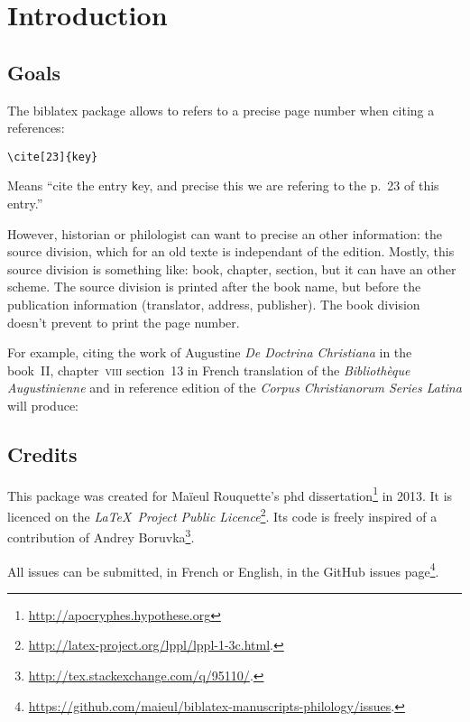 \documentclass{ltxdockit}[2011/03/25]
\newcommand{\biblatex}{biblatex\xspace}
\newcommand{\bibkey}[1]{\texttt #1}
\begin{document}
\printtitlepage

\tableofcontents
\section{Introduction}
\subsection{Goals}
The \biblatex package allows to refers to a precise page number when citing a references:
\begin{verbatim}
\cite[23]{key}
\end{verbatim}

Means \enquote{cite the entry {\bibkey key}, and precise this we are refering to the p.~23 of this entry.}

However, historian or philologist can want to precise an other information: the source division, which for an old texte is independant of the edition. Mostly, this source division is something like: book, chapter, section, but it can have an other scheme. The source division is printed after the book name, but before the publication information (translator, address, publisher). The book division doesn't prevent to print the page number. 

For example,  citing the work of Augustine \emph{De Doctrina Christiana} in the book~II, chapter~\textsc{viii} section~13 in French translation of the \emph{Bibliothèque Augustinienne} and in reference edition of the \emph{Corpus Christianorum Series Latina} will produce:


\subsection{Credits}

This package was created for Maïeul Rouquette's phd dissertation\footnote{\url{http://apocryphes.hypothese.org}} in 2013. It is licenced on the \emph{\LaTeX\ Project Public Licence}\footnote{\url{http://latex-project.org/lppl/lppl-1-3c.html}.}. 
Its code is freely inspired of a contribution of Andrey Boruvka\footnote{\url{http://tex.stackexchange.com/q/95110/}.}.

All issues can be submitted, in French or English, in the GitHub issues page\footnote{\url{https://github.com/maieul/biblatex-manuscripts-philology/issues}.}.
\end{document}
